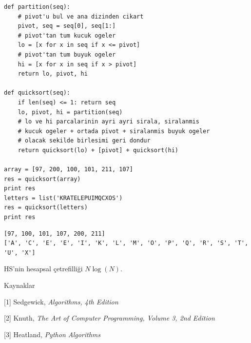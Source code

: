 \documentclass[12pt,fleqn]{article}\usepackage{../../common}
\begin{document}
\begin{verbatim}
def partition(seq):
    # pivot'u bul ve ana dizinden cikart
    pivot, seq = seq[0], seq[1:] 
    # pivot'tan tum kucuk ogeler
    lo = [x for x in seq if x <= pivot]
    # pivot'tan tum buyuk ogeler
    hi = [x for x in seq if x > pivot]
    return lo, pivot, hi 

def quicksort(seq):
    if len(seq) <= 1: return seq 
    lo, pivot, hi = partition(seq)
    # lo ve hi parcalarinin ayri ayri sirala, siralanmis
    # kucuk ogeler + ortada pivot + siralanmis buyuk ogeler
    # olacak sekilde birlesimi geri dondur
    return quicksort(lo) + [pivot] + quicksort(hi) 
    
array = [97, 200, 100, 101, 211, 107]
res = quicksort(array)
print res
letters = list('KRATELEPUIMQCXOS')
res = quicksort(letters)
print res
\end{verbatim}

\begin{verbatim}
[97, 100, 101, 107, 200, 211]
['A', 'C', 'E', 'E', 'I', 'K', 'L', 'M', 'O', 'P', 'Q', 'R', 'S', 'T', 'U', 'X']
\end{verbatim}

HS'nin hesapsal çetrefilliği $N\log(N)$. 

Kaynaklar

[1] Sedgewick, {\em Algorithms, 4th Edition}

[2] Knuth, {\em The Art of Computer Programming, Volume 3, 2nd Edition}

[3] Heatland, {\em Python Algorithms}
\end{document}
